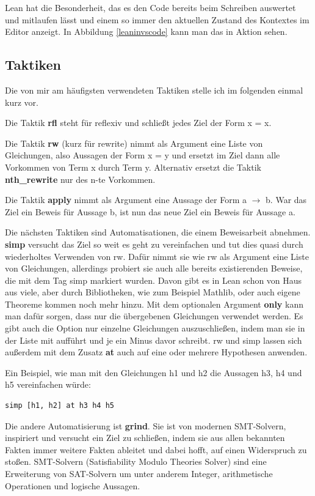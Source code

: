 Lean hat die Besonderheit, das es den Code bereits beim Schreiben auswertet und mitlaufen lässt und einem so immer den aktuellen Zustand des Kontextes im Editor anzeigt.
In Abbildung \ref{leaninvscode} kann man das in Aktion sehen.

\subsection{Taktiken}

Die von mir am häufigsten verwendeten Taktiken stelle ich im folgenden einmal kurz vor.

Die Taktik \textbf{rfl} steht für reflexiv und schließt jedes Ziel der Form x = x.

Die Taktik \textbf{rw} (kurz für rewrite) nimmt als Argument eine Liste von Gleichungen, also Aussagen der Form x = y und ersetzt im Ziel dann alle Vorkommen von Term x durch Term y.
Alternativ ersetzt die Taktik \textbf{nth\_rewrite} nur des n-te Vorkommen.

Die Taktik \textbf{apply} nimmt als Argument eine Aussage der Form a $\rightarrow$ b.
War das Ziel ein Beweis für Aussage b, ist nun das neue Ziel ein Beweis für Aussage a.

Die nächsten Taktiken sind Automatisationen, die einem Beweisarbeit abnehmen.
\textbf{simp} versucht das Ziel so weit es geht zu vereinfachen und tut dies quasi durch wiederholtes Verwenden von rw.
Dafür nimmt sie wie rw als Argument eine Liste von Gleichungen, allerdings probiert sie auch alle bereits existierenden Beweise, die mit dem Tag simp markiert wurden.
Davon gibt es in Lean schon von Haus aus viele, aber durch Bibliotheken, wie zum Beispiel Mathlib, oder auch eigene Theoreme kommen noch mehr hinzu.
Mit dem optionalen Argument \textbf{only} kann man dafür sorgen, dass nur die übergebenen Gleichungen verwendet werden.
Es gibt auch die Option nur einzelne Gleichungen auszuschließen, indem man sie in der Liste mit aufführt und je ein Minus davor schreibt.
rw und simp lassen sich außerdem mit dem Zusatz \textbf{at} auch auf eine oder mehrere Hypothesen anwenden.

Ein Beispiel, wie man mit den Gleichungen h1 und h2 die Aussagen h3, h4 und h5 vereinfachen würde:
\begin{lstlisting}
simp [h1, h2] at h3 h4 h5
\end{lstlisting}

Die andere Automatisierung ist \textbf{grind}.
Sie ist von modernen SMT-Solvern, inspiriert und versucht ein Ziel zu schließen, indem sie aus allen bekannten Fakten immer weitere Fakten ableitet und dabei hofft,
auf einen Widerspruch zu stoßen.
SMT-Solvern (Satisfiability Modulo Theories Solver) sind eine Erweiterung von SAT-Solvern um unter anderem Integer, arithmetische Operationen und logische Aussagen.

